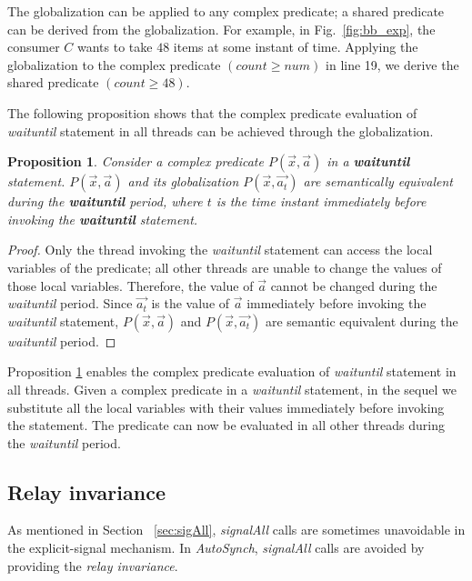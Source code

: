 \documentclass[preprint]{sigplanconf}
\newtheorem{proposition}{Proposition}
\begin{document}
The globalization can be applied to any complex predicate; a shared 
predicate can be derived from the globalization. For example, in
Fig.~\ref{fig:bb_exp}, the consumer $C$ wants to take $48$ items at some
instant of time. Applying the globalization to the complex predicate $(count \ge num)$
in line 19, we derive the shared predicate $(count \ge 48)$.

The following proposition shows that the complex predicate evaluation of
{\em waituntil} statement in all threads can be achieved through the globalization. 
\begin{proposition} \label{pro:glob}
    Consider a complex predicate $P(\vec{x}, \vec{a})$ in a \textbf
    {waituntil} 
    statement. $P(\vec{x}, \vec{a})$ and its globalization 
    $P(\vec{x}, \vec{a_t})$ are semantically equivalent during the \textbf{waituntil} 
    period, where $t$ is the time instant immediately before invoking the 
    \textbf{waituntil} statement.  
\end{proposition}
\begin{proof}
    Only the thread invoking the {\em waituntil} statement can access the
    local variables of the predicate; all other threads are unable to change
    the values of those local variables. Therefore, the value of $\vec{a}$
    cannot be changed 
    during the {\em waituntil} period. Since $\vec{a_t}$ is the value of $\vec{a}$
    immediately before invoking the {\em waituntil} statement, $P(\vec{x}, \vec{a})$
    and $P(\vec{x}, \vec{a_t})$ are semantic equivalent during the {\em waituntil}
    period. 
\end{proof}

Proposition \ref{pro:glob} enables the complex predicate evaluation of
{\em waituntil} statement in all threads. 
Given a complex predicate in a {\em waituntil} statement, in the sequel we substitute
all the local variables with their values immediately before invoking the
statement. The predicate can now be evaluated in all other threads during the
{\em waituntil} period. 

\subsection{Relay invariance} \label{sec:relay}
As mentioned in Section ~\ref{sec:sigAll}, {\em signalAll} calls are sometimes unavoidable
in the explicit-signal mechanism. In {\em AutoSynch}, {\em signalAll} calls are 
avoided by providing the {\em relay invariance}. 
\end{document}
